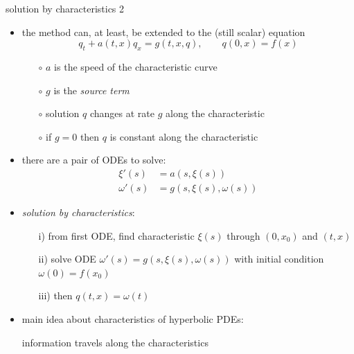 \documentclass[10pt,hyperref]{beamer}
\begin{document}
\begin{frame}{solution by characteristics 2}

\begin{itemize}
\item the method can, at least, be extended to the (still scalar) equation
     $$q_t + a(t,x) q_x = g(t,x,q), \qquad q(0,x) = f(x)$$

    \begin{itemize}
    \item[$\circ$] $a$ is the speed of the characteristic curve
    \item[$\circ$] $g$ is the \emph{source term}
    \item[$\circ$] solution $q$ changes at rate $g$ along the characteristic
    \item[$\circ$] if $g=0$ then $q$ is constant along the characteristic
    \end{itemize}
\item there are a pair of ODEs to solve:
\begin{align*}
\xi'(s) &= a(s,\xi(s)) \\
\omega'(s) &= g(s,\xi(s),\omega(s))
\end{align*}
\item \emph{solution by characteristics}:
    \begin{itemize}
    \item[i)] from first ODE, find characteristic $\xi(s)$ through $(0,x_0)$ and $(t,x)$
    \item[ii)] solve ODE $\omega'(s) = g(s,\xi(s),\omega(s))$ with initial condition $\omega(0)=f(x_0)$
    \item[iii)] then $q(t,x) = \omega(t)$
    \end{itemize}
\item \alert{main idea} about characteristics of hyperbolic PDEs:

\begin{center}
information travels along the characteristics
\end{center}
\end{itemize}
\end{frame}
\end{document}

